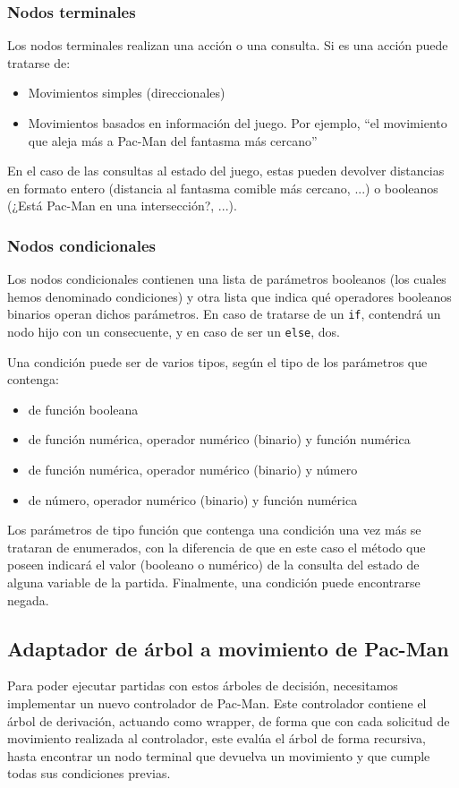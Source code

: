 \subsubsection{Nodos terminales}
Los nodos terminales realizan una acción o una consulta. Si es una acción puede tratarse de:
\begin{itemize}
\item Movimientos simples (direccionales)
\item Movimientos basados en información del juego. Por ejemplo, ``el movimiento que aleja más a Pac-Man del fantasma más cercano''
\end{itemize}

En el caso de las consultas al estado del juego, estas pueden devolver distancias en formato entero (distancia al fantasma comible más cercano, ...) o booleanos (¿Está Pac-Man en una intersección?, ...).

\subsubsection{Nodos condicionales}
Los nodos condicionales contienen una lista de parámetros booleanos (los cuales hemos denominado condiciones) y otra lista que indica qué operadores booleanos binarios operan dichos parámetros. En caso de tratarse de un \texttt{if}, contendrá un nodo hijo con un consecuente, y en caso de ser un \texttt{else}, dos.
 
Una condición puede ser de varios tipos, según el tipo de los parámetros que contenga:
\begin{itemize}
\item de función booleana
\item de función numérica, operador numérico (binario) y función numérica
\item de función numérica, operador numérico (binario) y número
\item de número, operador numérico (binario) y función numérica
\end{itemize}

Los parámetros de tipo función que contenga una condición una vez más se trataran de enumerados, con la diferencia de que en este caso el método que poseen indicará el valor (booleano o numérico) de la consulta del estado de alguna variable de la partida. Finalmente, una condición puede encontrarse negada.

\subsection{Adaptador de árbol a movimiento de Pac-Man}
Para poder ejecutar partidas con estos árboles de decisión, necesitamos implementar un nuevo controlador de Pac-Man. Este controlador contiene el árbol de derivación, actuando como wrapper, de forma que con cada solicitud de movimiento realizada al controlador, este evalúa el árbol de forma recursiva, hasta encontrar un nodo terminal que devuelva un movimiento y que cumple todas sus condiciones previas.

